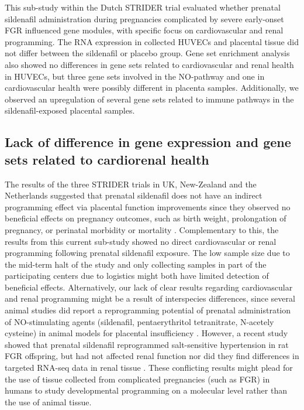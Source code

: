 \documentclass[authordate, empirical]{jote-new-article}
\begin{document}
This sub-study within the Dutch STRIDER trial evaluated whether prenatal sildenafil administration during pregnancies complicated by severe early-onset FGR influenced gene modules, with specific focus on cardiovascular and renal programming. The RNA expression in collected HUVECs and placental tissue did not differ between the sildenafil or placebo group. Gene set enrichment analysis also showed no differences in gene sets related to cardiovascular and renal health in HUVECs, but three gene sets involved in the NO-pathway and one in cardiovascular health were possibly different in placenta samples. Additionally, we observed an upregulation of several gene sets related to immune pathways in the sildenafil-exposed placental samples.







\subsection{Lack of difference in gene expression and gene sets related to cardiorenal health}



The results of the three STRIDER trials in UK, New-Zealand and the Netherlands suggested that prenatal sildenafil does not have an indirect programming effect via placental function improvements since they observed no beneficial effects on pregnancy outcomes, such as birth weight, prolongation of pregnancy, or perinatal morbidity or mortality \parencites{Groom2019}{Sharp2018}{Pels2020}. Complementary to this, the results from this current sub-study showed no direct cardiovascular or renal programming following prenatal sildenafil exposure. The low sample size due to the mid-term halt of the study and only collecting samples in part of the participating centers due to logistics might both have limited detection of beneficial effects. Alternatively, our lack of clear results regarding cardiovascular and renal programming might be a result of interspecies differences, since several animal studies did report a reprogramming potential of prenatal administration of NO-stimulating agents (sildenafil, pentaerythritol tetranitrate, N-acetely cysteine) in animal models for placental insufficiency \parencites{Herrera2017}{Itani2017}{Wu2015}. However, a recent study showed that prenatal sildenafil reprogrammed salt-sensitive hypertension in rat FGR offspring, but had not affected renal function nor did they find differences in targeted RNA-seq data in renal tissue \parencites{Turbeville2020}. These conflicting results might plead for the use of tissue collected from complicated pregnancies (such as FGR) in humans to study developmental programming on a molecular level rather than the use of animal tissue.
\end{document}
